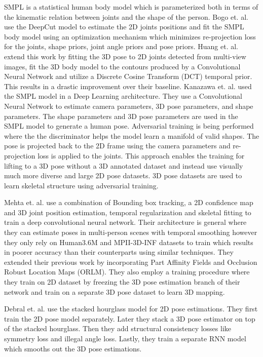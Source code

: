 SMPL \parencite{loper2015smpl} is a statistical human body model which is parameterized both in terms of the kinematic relation between joints and the shape of the person. Bogo et. al. \parencite{bogo2016keep} use the DeepCut \parencite{pishchulin2016deepcut} model to estimate the 2D joints positions and fit the SMPL body model using an optimization mechanism which minimizes re-projection loss for the joints, shape priors, joint angle priors and pose priors. Huang et. al. extend this work \parencite{huang2017towards} by fitting the 3D pose to 2D joints detected from multi-view images, fit the 3D body model to the contours produced by a Convolutional Neural Network and utilize a Discrete Cosine Transform (DCT) \parencite{akhter2012bilinear} temporal prior. This results in a drastic improvement over their baseline. Kanazawa et. al. \parencite{kanazawa2017end} used the SMPL model in a Deep Learning architecture. They use a Convolutional Neural Network to estimate camera parameters, 3D pose parameters, and shape parameters. The shape parameters and 3D pose parameters are used in the SMPL model to generate a human pose. Adversarial training is being performed where the the discriminator helps the model learn a manifold of valid shapes. The pose is projected back to the 2D frame using the camera parameters and re-projection loss is applied to the joints. This approach enables the training for lifting to a 3D pose without a 3D annotated dataset and instead use visually much more diverse and large 2D pose datasets. 3D pose datasets are used to learn skeletal structure using adversarial training.   

Mehta et. al. \parencite{mehta2017vnect} use a combination of Bounding box tracking, a 2D confidence map and 3D joint position estimation, temporal regularization and skeletal fitting to train a deep convolutional neural network. Their architecture is general where they can estimate poses in multi-person scenes with temporal smoothing however they only rely on Human3.6M and MPII-3D-INF datasets to train which results in poorer accuracy than their counterparts using similar techniques. They extended their previous work \parencite{mehta2017single} by incorporating Part Affinity Fields \parencite{cao2016realtime} and Occlusion Robust Location Maps (ORLM). They also employ a training procedure where they train on 2D dataset by freezing the 3D pose estimation branch of their network and train on a separate 3D pose dataset to learn 3D mapping.

Debral et. al. \parencite{dabral2017structure} use the stacked hourglass \parencite{newell2016stacked} model for 2D pose estimations. They first train the 2D pose model separately. Later they stack a 3D pose estimator on top of the stacked hourglass. Then they add structural consistency losses like symmetry loss and illegal angle loss. Lastly, they train a separate RNN model which smooths out the 3D pose estimations.
